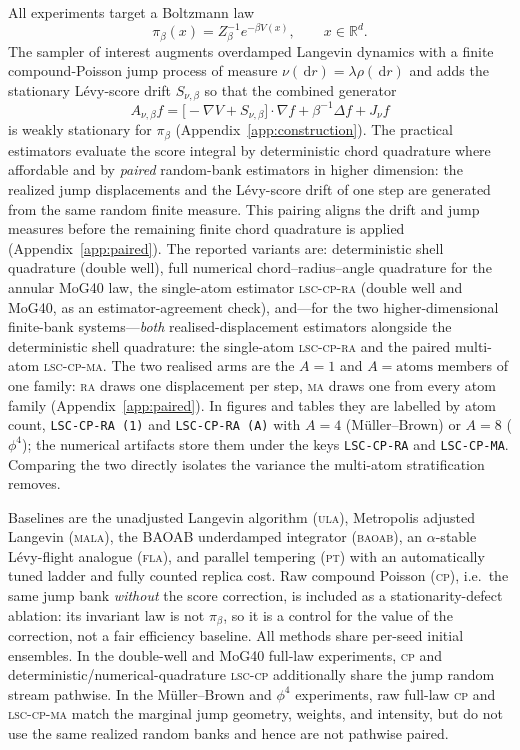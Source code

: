\documentclass[11pt]{article}
\newcommand{\R}{\mathbb{R}}
\newcommand{\dd}{\,\mathrm{d}}
\newcommand{\piB}{\pi_\beta}
\begin{document}
All experiments target a Boltzmann law
\begin{equation}
 \piB(x)=Z_\beta^{-1}e^{-\beta V(x)},\qquad x\in\R^d .
 \label{eq:target}
\end{equation}
The sampler of interest augments overdamped Langevin dynamics with a finite
compound-Poisson jump process of measure $\nu(\dd r)=\lambda\rho(\dd r)$ and
adds the stationary L\'evy-score drift $S_{\nu,\beta}$ so that the combined
generator
\begin{equation}
 A_{\nu,\beta}f
 =\bigl[-\nabla V+S_{\nu,\beta}\bigr]\cdot\nabla f
  +\beta^{-1}\Delta f+J_\nu f
 \label{eq:corrected-generator}
\end{equation}
is weakly stationary for $\piB$ (Appendix~\ref{app:construction}).  The
practical estimators evaluate the score integral by deterministic chord
quadrature where affordable and by \emph{paired} random-bank estimators in
higher dimension: the realized jump displacements and the L\'evy-score drift of
one step are generated from the same random finite measure.  This pairing
aligns the drift and jump measures before the remaining finite chord
quadrature is applied (Appendix~\ref{app:paired}).  The reported variants are:
deterministic shell quadrature (double well), full numerical
chord--radius--angle quadrature for the annular MoG40 law, the single-atom
estimator \textsc{lsc-cp-ra} (double well and MoG40, as an estimator-agreement
check), and---for the two higher-dimensional finite-bank systems---\emph{both}
realised-displacement estimators alongside the deterministic shell quadrature:
the single-atom \textsc{lsc-cp-ra} and the paired multi-atom \textsc{lsc-cp-ma}.
The two realised arms are the $A{=}1$ and $A{=}\text{atoms}$ members of one
family: \textsc{ra} draws one displacement per step, \textsc{ma} draws one from
every atom family (Appendix~\ref{app:paired}).  In figures and tables they are
labelled by atom count, \texttt{LSC-CP-RA (1)} and \texttt{LSC-CP-RA (A)} with
$A{=}4$ (M\"uller--Brown) or $A{=}8$ ($\phi^4$); the numerical artifacts store
them under the keys \texttt{LSC-CP-RA} and \texttt{LSC-CP-MA}.  Comparing the
two directly isolates the variance the multi-atom stratification removes.

Baselines are the unadjusted Langevin algorithm (\textsc{ula}), Metropolis
adjusted Langevin (\textsc{mala}), the BAOAB underdamped integrator
(\textsc{baoab}), an $\alpha$-stable L\'evy-flight analogue (\textsc{fla}),
and parallel tempering (\textsc{pt}) with an automatically tuned ladder and
fully counted replica cost.  Raw compound Poisson (\textsc{cp}), i.e.\ the
same jump bank \emph{without} the score correction, is included as a
stationarity-defect ablation: its invariant law is not $\piB$, so it is a
control for the value of the correction, not a fair efficiency baseline.  All
methods share per-seed initial ensembles.  In the double-well and MoG40
full-law experiments, \textsc{cp} and deterministic/numerical-quadrature
\textsc{lsc-cp} additionally share the jump random stream pathwise.  In the
M\"uller--Brown and $\phi^4$ experiments, raw full-law \textsc{cp} and
\textsc{lsc-cp-ma} match the marginal jump geometry, weights, and intensity,
but do not use the same realized random banks and hence are not pathwise
paired.
\end{document}
